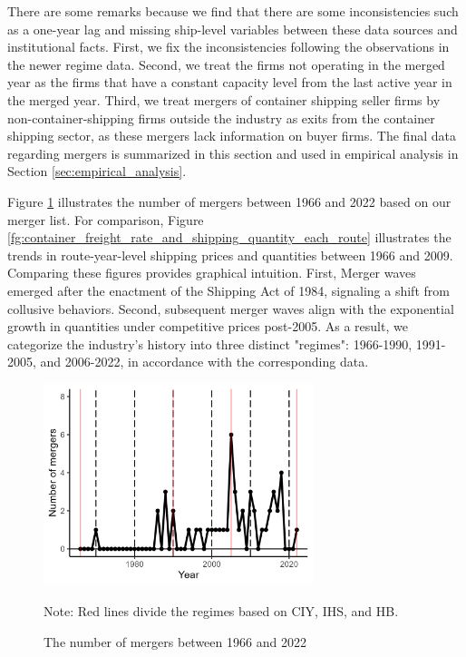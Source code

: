\documentclass[10pt]{article}
\begin{document}
There are some remarks because we find that there are some inconsistencies such as a one-year lag and missing ship-level variables between these data sources and institutional facts. 
First, we fix the inconsistencies following the observations in the newer regime data. 
Second, we treat the firms not operating in the merged year as the firms that have a constant capacity level from the last active year in the merged year. %
Third, we treat mergers of container shipping seller firms by non-container-shipping firms outside the industry as exits from the container shipping sector, as these mergers lack information on buyer firms.
The final data regarding mergers is summarized in this section and used in empirical analysis in Section \ref{sec:empirical_analysis}.

Figure \ref{fg:number_of_mergers} illustrates the number of mergers between 1966 and 2022 based on our merger list.
For comparison, Figure \ref{fg:container_freight_rate_and_shipping_quantity_each_route} illustrates the trends in route-year-level shipping prices and quantities between 1966 and 2009.
Comparing these figures provides graphical intuition. 
First, Merger waves emerged after the enactment of the Shipping Act of 1984, signaling a shift from collusive behaviors.
Second, subsequent merger waves align with the exponential growth in quantities under competitive prices post-2005.
As a result, we categorize the industry's history into three distinct "regimes": 1966-1990, 1991-2005, and 2006-2022, in accordance with the corresponding data.


\begin{figure}[!ht]
\begin{center}
  \includegraphics[width = 0.7\textwidth]
  {figuretable/number_of_mergers.png}
  \caption{The number of mergers between 1966 and 2022}
  \label{fg:number_of_mergers}
  \end{center}
\footnotesize
   Note: Red lines divide the regimes based on CIY, IHS, and HB.
\end{figure}
\end{document}
